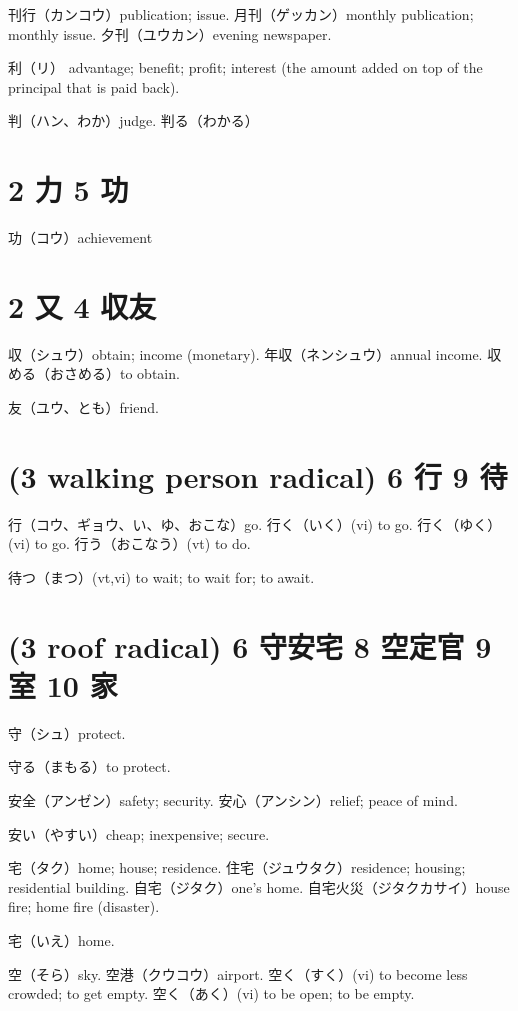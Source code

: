 刊行（カンコウ）publication; issue.
月刊（ゲッカン）monthly publication; monthly issue.
夕刊（ユウカン）evening newspaper.

利（リ）
advantage; benefit; profit;
interest (the amount added on top of the principal that is paid back).

判（ハン、わか）judge.
判る（わかる）

\section{2 力 5 功}

功（コウ）achievement

\section{2 又 4 収友}

収（シュウ）obtain; income (monetary).
年収（ネンシュウ）annual income.
収める（おさめる）to obtain.

友（ユウ、とも）friend.

\section{(3 walking person radical) 6 行 9 待}

行（コウ、ギョウ、い、ゆ、おこな）go.
行く（いく）(vi) to go.
行く（ゆく）(vi) to go.
行う（おこなう）(vt) to do.

待つ（まつ）(vt,vi) to wait; to wait for; to await.

\section{(3 roof radical) 6 守安宅 8 空定官 9 室 10 家}

守（シュ）protect.

守る（まもる）to protect.

安全（アンゼン）safety; security.
安心（アンシン）relief; peace of mind.

安い（やすい）cheap; inexpensive; secure.

宅（タク）home; house; residence.
住宅（ジュウタク）residence; housing; residential building.
自宅（ジタク）one's home.
自宅火災（ジタクカサイ）house fire; home fire (disaster).

宅（いえ）home.

空（そら）sky.
空港（クウコウ）airport.
空く（すく）(vi) to become less crowded; to get empty.
空く（あく）(vi) to be open; to be empty.

